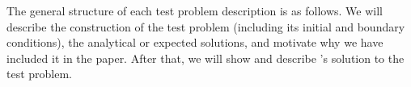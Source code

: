 The general structure of each test problem description is as follows.
We will describe the construction of the test problem (including its
initial and boundary conditions), the analytical or expected
solutions, and motivate why we have included it in the paper.  After
that, we will show and describe \enzo's solution to the test problem.
































